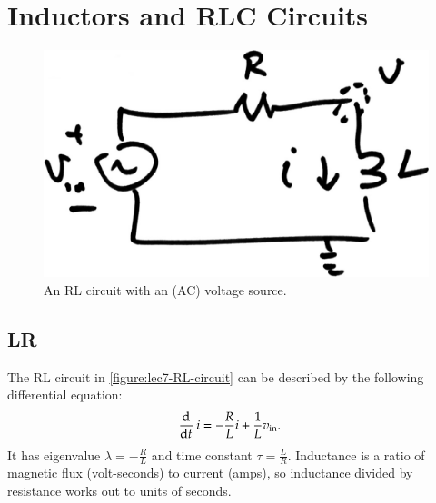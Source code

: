 \chapter{Inductors and RLC Circuits}
\begin{figure}
  \centering
  \includegraphics[width=0.4\linewidth]{figures/7/RL-circuit}
  \caption{An RL circuit with an (AC) voltage source.}
  \label{figure:lec7-RL-circuit}
\end{figure}

\section{LR}

The RL circuit in \autoref{figure:lec7-RL-circuit} can be described by the following differential equation:
\begin{align}
  \dod{}{t} i
  &= -\frac{R}{L} i + \frac{1}{L} v_\text{in}.
\end{align}
It has eigenvalue \(\lambda = -\frac{R}{L}\) and time constant \(\tau = \frac{L}{R}\).
Inductance is a ratio of magnetic flux (volt-seconds) to current (amps), so inductance divided by resistance works out to units of seconds.


